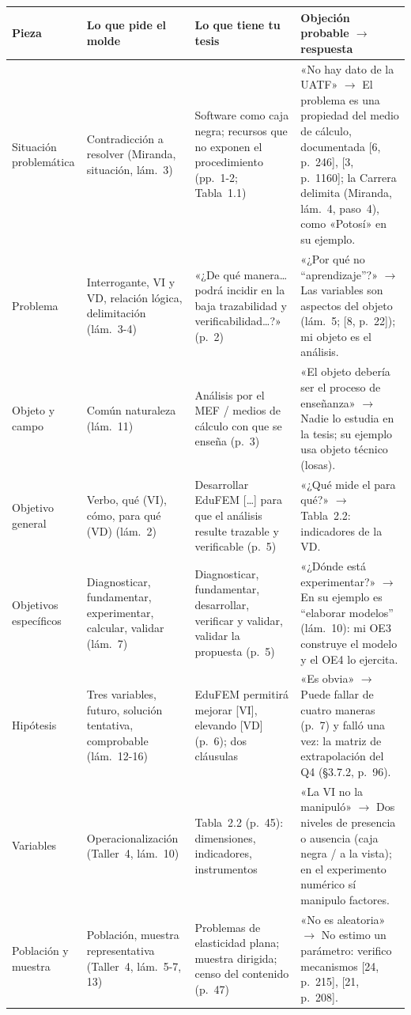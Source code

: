 \documentclass[11pt,a4paper]{article}
\begin{document}
{\small
\begin{longtable}{@{}L{2.1cm}L{3.4cm}L{3.7cm}L{6.1cm}@{}}
\toprule
\textbf{Pieza} & \textbf{Lo que pide el molde} & \textbf{Lo que tiene tu tesis} & \textbf{Objeción probable $\to$ respuesta}\\
\midrule\endhead
\bottomrule\endfoot
Situación problemática & Contradicción a resolver (Miranda, situación, lám.~3) & Software como caja negra; recursos que no exponen el procedimiento (pp.~1-2; Tabla~1.1) & «No hay dato de la UATF» $\to$ El problema es una propiedad del medio de cálculo, documentada [6, p.~246], [3, p.~1160]; la Carrera delimita (Miranda, lám.~4, paso~4), como «Potosí» en su ejemplo.\\
Problema & Interrogante, VI y VD, relación lógica, delimitación (lám.~3-4) & «¿De qué manera\ldots podrá incidir en la baja trazabilidad y verificabilidad\ldots?» (p.~2) & «¿Por qué no “aprendizaje”?» $\to$ Las variables son aspectos del objeto (lám.~5; [8, p.~22]); mi objeto es el análisis.\\
Objeto y campo & Común naturaleza (lám.~11) & Análisis por el MEF / medios de cálculo con que se enseña (p.~3) & «El objeto debería ser el proceso de enseñanza» $\to$ Nadie lo estudia en la tesis; su ejemplo usa objeto técnico (losas).\\
Objetivo general & Verbo, qué (VI), cómo, para qué (VD) (lám.~2) & Desarrollar EduFEM [\ldots] para que el análisis resulte trazable y verificable (p.~5) & «¿Qué mide el para qué?» $\to$ Tabla~2.2: indicadores de la VD.\\
Objetivos específicos & Diagnosticar, fundamentar, experimentar, calcular, validar (lám.~7) & Diagnosticar, fundamentar, desarrollar, verificar y validar, validar la propuesta (p.~5) & «¿Dónde está experimentar?» $\to$ En su ejemplo es “elaborar modelos” (lám.~10): mi OE3 construye el modelo y el OE4 lo ejercita.\\
Hipótesis & Tres variables, futuro, solución tentativa, comprobable (lám.~12-16) & EduFEM permitirá mejorar [VI], elevando [VD] (p.~6); dos cláusulas & «Es obvia» $\to$ Puede fallar de cuatro maneras (p.~7) y falló una vez: la matriz de extrapolación del Q4 (§3.7.2, p.~96).\\
Variables & Operacionalización (Taller~4, lám.~10) & Tabla~2.2 (p.~45): dimensiones, indicadores, instrumentos & «La VI no la manipuló» $\to$ Dos niveles de presencia o ausencia (caja negra / a la vista); en el experimento numérico sí manipulo factores.\\
Población y muestra & Población, muestra representativa (Taller~4, lám.~5-7, 13) & Problemas de elasticidad plana; muestra dirigida; censo del contenido (p.~47) & «No es aleatoria» $\to$ No estimo un parámetro: verifico mecanismos [24, p.~215], [21, p.~208].\\

\end{longtable}}
\end{document}
